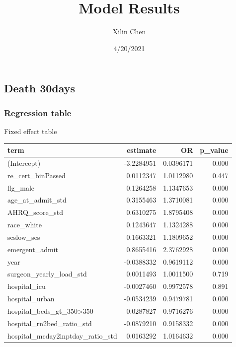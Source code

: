 \documentclass[
]{article}
\title{Model Results}
\author{Xilin Chen}
\date{4/20/2021}
\begin{document}
\maketitle

\hypertarget{death-30days}{%
\subsection{Death 30days}\label{death-30days}}

\hypertarget{regression-table}{%
\subsubsection{Regression table}\label{regression-table}}

Fixed effect table

\begin{table}[H]
\centering
\begin{tabular}{l|r|r|r}
\hline
term & estimate & OR & p\_value\\
\hline
(Intercept) & -3.2284951 & 0.0396171 & 0.000\\
\hline
re\_cert\_binPassed & 0.0112347 & 1.0112980 & 0.447\\
\hline
flg\_male & 0.1264258 & 1.1347653 & 0.000\\
\hline
age\_at\_admit\_std & 0.3155463 & 1.3710081 & 0.000\\
\hline
AHRQ\_score\_std & 0.6310275 & 1.8795408 & 0.000\\
\hline
race\_white & 0.1243647 & 1.1324288 & 0.000\\
\hline
seslow\_ses & 0.1663321 & 1.1809652 & 0.000\\
\hline
emergent\_admit & 0.8655416 & 2.3762928 & 0.000\\
\hline
year & -0.0388332 & 0.9619112 & 0.000\\
\hline
surgeon\_yearly\_load\_std & 0.0011493 & 1.0011500 & 0.719\\
\hline
hospital\_icu & -0.0027460 & 0.9972578 & 0.891\\
\hline
hospital\_urban & -0.0534239 & 0.9479781 & 0.000\\
\hline
hospital\_beds\_gt\_350>350 & -0.0287827 & 0.9716276 & 0.000\\
\hline
hospital\_rn2bed\_ratio\_std & -0.0879210 & 0.9158332 & 0.000\\
\hline
hospital\_mcday2inptday\_ratio\_std & 0.0163292 & 1.0164632 & 0.000\\
\hline
\end{tabular}
\end{table}
\end{document}
